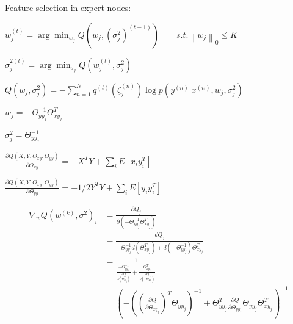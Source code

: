 \documentclass{article}
\begin{document}
Feature selection in expert nodes: \\
\begin{description}
\setlength{\itemindent}{5em}
\item $ w_j^{(t)} = \arg\min_{w_j} Q(w_j,(\sigma_j^2)^{(t-1)}) 
	\qquad s.t. \left \| w_j\right \|_0 \le K $ \\
\item $ \sigma_j^{2(t)} = \arg\min_{\sigma_j} Q(w_j^{(t)}, \sigma_j^2) $ \\
\item $ Q(w_j, \sigma_j^2) = -\sum_{n=1}^{N} q^{(t)} (\zeta_j^{(n)}) 
	\log p(y^{(n)} | x^{(n)}, w_j, \sigma_j^2 ) $ \\
\item $ w_j = -\Theta^{-1}_{yy_j}\Theta^T_{xy_j} $ \\
\item $ \sigma^2_j = \Theta^{-1}_{yy_j} $ \\
\item $ \displaystyle \frac{\partial Q (X,Y,\Theta_{xy},\Theta_{yy})}
	{\partial \Theta_{xy}} =	-X^T Y + \sum_i E[x_i y_i^T] $ \\
\item $ \displaystyle \frac{\partial Q (X,Y,\Theta_{xy},\Theta_{yy})}
	{\partial \Theta_{yy}} =-1/2Y^T Y + \sum_i E[y_i y_i^T] $ 
\end{description}

\begin{align*}
\nabla_w Q(w^{(k)}, \sigma^2)_i & = \frac{\partial Q_j}{
	\partial (-\Theta^{-1}_{yy_j}\Theta^T_{xy_j}) } \\
	& = \frac{d Q_j}{
		-\Theta^{-1}_{yy_j}d(\Theta^T_{xy_j})
		 + d(-\Theta^{-1}_{yy_j}) \Theta^T_{xy_j} } \\
	& = \frac{1}{ \frac{-\Theta^{-1}_{yy_j}}{ \frac{\partial Q}
	{\partial(\Theta^T_{xy_j}) }}
		+\frac{\Theta^T_{xy_j}}{ \frac{\partial Q}
		{\partial(-\Theta^{-1}_{yy_j})}} } \\
	& = {\left( - {\left( {(\frac{\partial Q} {\partial\Theta_{xy_j}})}^T
	 \Theta_{yy_j}\right)}^{-1}
		+ {\Theta^T_{yy_j}} {\frac{\partial Q}{\partial\Theta_{yy_j}}
			\Theta_{yy_j}\Theta_{xy_j}^T} \right)}^{-1} \\
\end{align*} 
\end{document}

